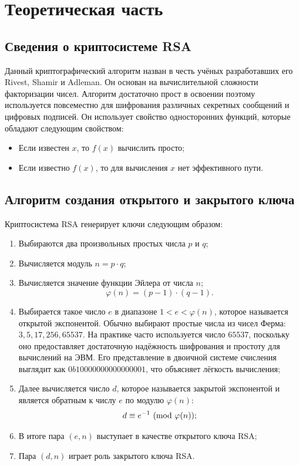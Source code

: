 \section{Теоретическая часть}

\subsection{Сведения о криптосистеме RSA}

Данный криптографический алгоритм назван в честь учёных разработавших его Rivest, Shamir и Adleman.
Он основан на вычислительной сложности факторизации чисел.
Алгоритм достаточно прост в освоении поэтому используется повсеместно для шифрования различных секретных 
сообщений и цифровых подписей. Он использует свойство односторонних функций, которые обладают следующим свойством:
\begin{itemize}
	\item Если известен $x$, то $f(x)$ вычислить просто;
	\item Если известно $f(x)$, то для вычисления $x$ нет эффективного пути.
\end{itemize}

\subsection{Алгоритм создания открытого и закрытого ключа}

Криптосистема RSA генерирует ключи следующим образом\cite{RSASpecs}:
\begin{enumerate}
	\item Выбираются два произвольных простых числа $p$ и $q$;
	\item Вычисляется модуль $n=p\cdot q$;
	\item Вычисляется значение функции Эйлера от числа $n$;
	$$
	\varphi(n)=(p-1)\cdot(q-1).
	$$
	\item Выбирается такое число $e$ в диапазоне $1 < e < \varphi(n)$, которое называется открытой экспонентой.
    Обычно выбирают простые числа из чисел Ферма: $3, 5, 17 ,256 ,65537$.
    На практике часто используется число $65537$, поскольку оно предоставляет достаточную надёжность шифрования и простоту для вычислений на ЭВМ.
    Его представление в двоичной системе счисления выглядит как $0b10000000000000001$, что объясняет лёгкость вычисления;
	\item Далее вычисляется число $d$, которое называется закрытой экспонентой и является обратным к числу $e$ по модулю $\varphi(n)$:
	$$
	d \equiv e^{-1} \ (\mathrm{mod}\ \varphi(n));
	$$
	\item В итоге пара $(e,n)$ выступает в качестве открытого ключа RSA;
	\item Пара $(d,n)$ играет роль закрытого ключа RSA.
\end{enumerate}

